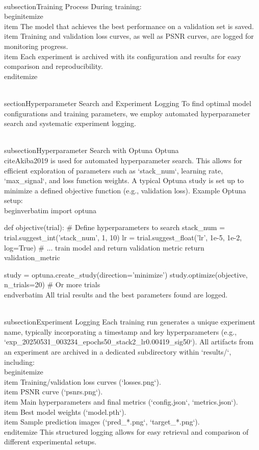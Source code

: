 \documentclass[10pt,journal]{IEEEtran} %
\begin{document}
\\subsection{Training Process}
During training:
\\begin{itemize}
    \\item The model that achieves the best performance on a validation set is saved.
    \\item Training and validation loss curves, as well as PSNR curves, are logged for monitoring progress.
    \\item Each experiment is archived with its configuration and results for easy comparison and reproducibility.
\\end{itemize}

\\section{Hyperparameter Search and Experiment Logging}
To find optimal model configurations and training parameters, we employ automated hyperparameter search and systematic experiment logging.

\\subsection{Hyperparameter Search with Optuna}
Optuna \\cite{Akiba2019} is used for automated hyperparameter search. This allows for efficient exploration of parameters such as `stack_num`, learning rate, `max_signal`, and loss function weights. A typical Optuna study is set up to minimize a defined objective function (e.g., validation loss).
Example Optuna setup:
\\begin{verbatim}
import optuna

def objective(trial):
    # Define hyperparameters to search
    stack_num = trial.suggest_int('stack_num', 1, 10)
    lr = trial.suggest_float('lr', 1e-5, 1e-2, log=True)
    # ... train model and return validation metric
    return validation_metric

study = optuna.create_study(direction='minimize')
study.optimize(objective, n_trials=20) # Or more trials
\\end{verbatim}
All trial results and the best parameters found are logged.

\\subsection{Experiment Logging}
Each training run generates a unique experiment name, typically incorporating a timestamp and key hyperparameters (e.g., `exp_20250531_003234_epochs50_stack2_lr0.00419_sig50`). All artifacts from an experiment are archived in a dedicated subdirectory within `results/`, including:
\\begin{itemize}
    \\item Training/validation loss curves (`losses.png`).
    \\item PSNR curve (`psnrs.png`).
    \\item Main hyperparameters and final metrics (`config.json`, `metrics.json`).
    \\item Best model weights (`model.pth`).
    \\item Sample prediction images (`pred_*.png`, `target_*.png`).
\\end{itemize}
This structured logging allows for easy retrieval and comparison of different experimental setups.
\end{document}
